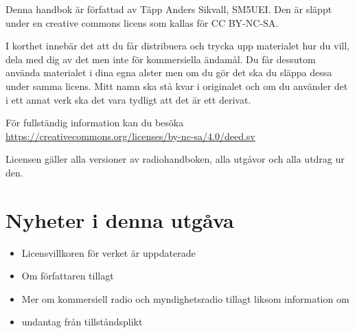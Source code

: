 Denna handbok är författad av Täpp Anders Sikvall, SM5UEI. Den är
släppt under en creative commons licens som kallas för CC BY-NC-SA.

I korthet innebär det att du får distribuera och trycka upp materialet
hur du vill, dela med dig av det men inte för kommersiella ändamål. Du
får dessutom använda materialet i dina egna alster men om du gör det
ska du släppa dessa under samma licens. Mitt namn ska stå kvar i
originalet och om du använder det i ett annat verk ska det vara
tydligt att det är ett derivat.

För fullständig information kan du besöka\\
\url{https://creativecommons.org/licenses/by-nc-sa/4.0/deed.sv}

Licensen gäller alla versioner av radiohandboken, alla utgåvor och
alla utdrag ur den.

\clearpage

\section*{Nyheter i denna utgåva}

\begin{itemize}
  \item Licensvillkoren för verket är uppdaterade
  \item Om författaren tillagt
  \item Mer om kommersiell radio och myndighetsradio tillagt liksom information om
  \item undantag från tillståndsplikt
\end{itemize}

\clearpage
